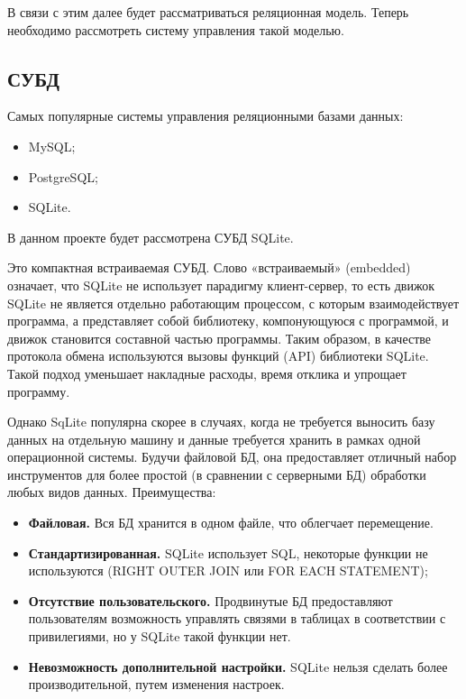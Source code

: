 \documentclass[a4paper, 14pt]{article}
\begin{document}
	В связи с этим далее будет рассматриваться реляционная модель. Теперь необходимо рассмотреть систему управления такой моделью.
	
	\subsection{СУБД}
	
	Самых популярные системы управления реляционными базами данных:
	\begin{itemize}
		\item MySQL;
		\item PostgreSQL; 
		\item SQLite.
	\end{itemize}
	
	В данном проекте будет рассмотрена СУБД SQLite.
	
	Это компактная встраиваемая СУБД. Слово «встраиваемый» (embedded) означает, что SQLite не использует парадигму клиент-сервер, то есть движок SQLite не является отдельно работающим процессом, с которым взаимодействует программа, а представляет собой библиотеку, компонующуюся с программой, и движок становится составной частью программы. Таким образом, в качестве протокола обмена используются вызовы функций (API) библиотеки SQLite. Такой подход уменьшает накладные расходы, время отклика и упрощает программу.
	
	Однако SqLite популярна скорее в случаях, когда не требуется выносить базу данных на отдельную машину и данные требуется хранить в рамках одной операционной системы. Будучи файловой БД, она предоставляет отличный набор инструментов для более простой (в сравнении с серверными БД) обработки любых видов данных. \cite{1}
	\newpage
	Преимущества:
	
	\begin{itemize}
		\item {\bf Файловая.} Вся БД хранится в одном файле, что облегчает перемещение.
		\item {\bf Стандартизированная.} SQLite использует SQL, некоторые функции не используются (RIGHT OUTER JOIN или FOR EACH STATEMENT);
		\item {\bf Отсутствие пользовательского.} Продвинутые БД предоставляют пользователям возможность управлять связями в таблицах в соответствии с привилегиями, но у SQLite такой функции нет.
		\item {\bf Невозможность дополнительной настройки.} SQLite нельзя сделать более производительной, путем изменения настроек.
	\end{itemize}
	
\end{document}
